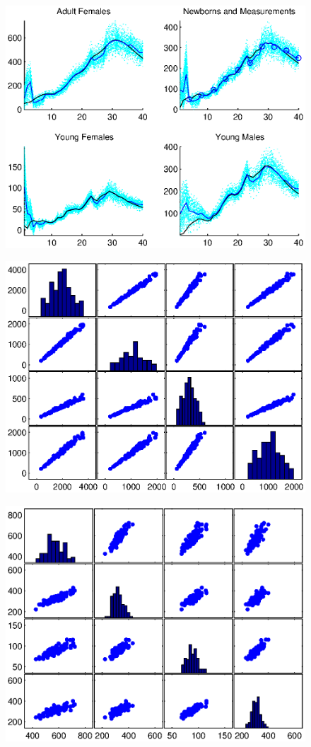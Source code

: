 \documentclass[fleqn, letterpaper]{amsart}
\begin{document}
\begin{figure}
\includegraphics[width=1\textwidth]{kf}
\end{figure}
\begin{figure}
\includegraphics[width=1\textwidth]{rol30cov}
\end{figure}
\begin{figure}
\includegraphics[width=1\textwidth]{rkf30cov}
\end{figure}



\end{document}
